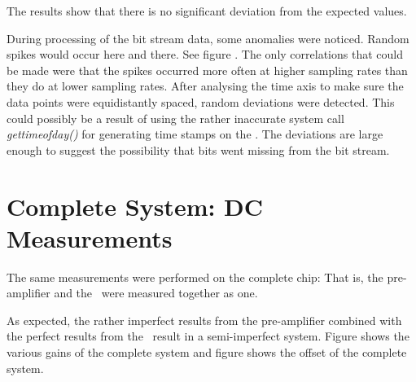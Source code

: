 The  results  show that there is no significant deviation  from  the  expected
values.

During processing of the bit stream data, some anomalies were noticed.  Random
spikes would  occur  here and there. See figure 
.
The only correlations that could  be  made  were that the
spikes  occurred  more  often  at  higher sampling rates than they do at lower
sampling rates. After analysing the time axis  to  make  sure  the data points
were  equidistantly  spaced,  random  deviations  were  detected.  This  could
possibly   be   a  result  of  using  the  rather   inaccurate   system   call
\textit{gettimeofday()}  for  generating  time  stamps  on  the   \raspi.  The
deviations are large enough to  suggest the possibility that bits went missing
from the bit stream.

\section{Complete System: DC Measurements}
\label{sec:systemDC}

The  same  measurements  were  performed  on  the complete chip: That is,  the
pre-amplifier and the \sdm~were measured together as one.

As expected, the rather imperfect results from the pre-amplifier combined with
the  perfect  results  from the \sdm~result in a semi-imperfect system. Figure
 shows the various gains  of
the complete system and  figure  
shows the offset of the complete system.
